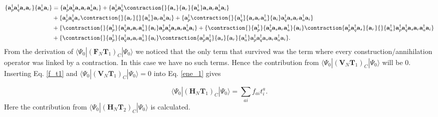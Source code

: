 \begin{align}
\{\textbf{a}^{\dag}_p \textbf{a}^{\dag}_q \textbf{a}_s \textbf{a}_r \} \{\textbf{a}_a^{\dag} \textbf{a}_i \} & = \{
\textbf{a}^{\dag}_p \textbf{a}^{\dag}_q \textbf{a}_s \textbf{a}_r \textbf{a}_a^{\dag} \textbf{a}_i 
\} 
+ 
\{ \textbf{a}^{\dag}_p \textbf{a}^{\dag}_q
\contraction{}{\textbf{a}_s}{\textbf{a}_r}{\textbf{a}_a^{\dag}}
 \textbf{a}_s \textbf{a}_r \textbf{a}_a^{\dag}
  \textbf{a}_i 
\}  \\ &
+ 
\{ \textbf{a}^{\dag}_p \textbf{a}^{\dag}_q \textbf{a}_s
\contraction{}{\textbf{a}_r}{}{\textbf{a}_a^{\dag}}
\textbf{a}_r \textbf{a}_a^{\dag}
\textbf{a}_i
\}
+ \{ \textbf{a}^{\dag}_p
\contraction{}{\textbf{a}^{\dag}_q}{\textbf{a}_s \textbf{a}_r \textbf{a}_a^{\dag}}{\textbf{a}_i}
\textbf{a}^{\dag}_q \textbf{a}_s \textbf{a}_r \textbf{a}_a^{\dag} \textbf{a}_i \} \nonumber \\ &
+ \{
\contraction{}{\textbf{a}^{\dag}_p}{\textbf{a}^{\dag}_q \textbf{a}_s \textbf{a}_r \textbf{a}_a^{\dag}}{\textbf{a}_i}
\textbf{a}^{\dag}_p \textbf{a}^{\dag}_q \textbf{a}_s \textbf{a}_r \textbf{a}_a^{\dag} \textbf{a}_i
\}
+ \{
\contraction{}{\textbf{a}^{\dag}_p}{\textbf{a}^{\dag}_q \textbf{a}_s \textbf{a}_r \textbf{a}_a^{\dag}}{\textbf{a}_i}
\contraction{\textbf{a}^{\dag}_p \textbf{a}^{\dag}_q \textbf{a}_s}{\textbf{a}_r}{}{\textbf{a}_a^{\dag}}
\textbf{a}^{\dag}_p \textbf{a}^{\dag}_q \textbf{a}_s \textbf{a}_r \textbf{a}_a^{\dag} \textbf{a}_i
\} \nonumber \\ &
+ \{
\contraction{}{\textbf{a}^{\dag}_p}{\textbf{a}^{\dag}_q \textbf{a}_s \textbf{a}_r \textbf{a}_a^{\dag}}{\textbf{a}_i}
\contraction{\textbf{a}^{\dag}_p \textbf{a}^{\dag}_q}{\textbf{a}_s}{\textbf{a}_r}{\textbf{a}_a^{\dag}}
\textbf{a}^{\dag}_p \textbf{a}^{\dag}_q \textbf{a}_s \textbf{a}_r \textbf{a}_a^{\dag} \textbf{a}_i
\} . \nonumber
\end{align}
From the derivation of $\langle \Psi_0 | (\textbf{F}_N \textbf{T}_1)_C | \Psi_0 \rangle$ we noticed that the only term that survived was the term where every construction/annihilation operator was linked by a contraction. In this case we have no such terms. Hence the contribution from $\langle \Psi_0 | (\textbf{V}_N \textbf{T}_1)_C | \Psi_0 \rangle$ will be 0. \\

Inserting Eq. \eqref{f_t1} and $\langle \Psi_0 | (\textbf{V}_N \textbf{T}_1)_C | \Psi_0 \rangle = 0$ into Eq. \eqref{ene_1} gives 

\begin{equation}
\langle \Psi_0 | (\textbf{H}_N \textbf{T}_1)_C | \Psi_0 \rangle = \sum_{ai} f_{ai} t_i^a . \label{Energy_Contribution_1}
\end{equation}
Here the contribution from $\langle \Psi_0 | (\textbf{H}_N \textbf{T}_2)_C | \Psi_0 \rangle$ is calculated.

